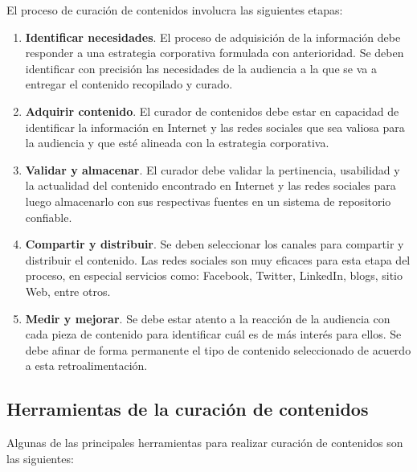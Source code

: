 El proceso de curación de contenidos involucra las siguientes etapas:

\begin{enumerate}
    \item \textbf{Identificar necesidades}. El proceso de adquisición de la información debe responder a una estrategia corporativa formulada con anterioridad. Se deben identificar con precisión las necesidades de la audiencia a la que se va a entregar el contenido recopilado y curado.
    \item \textbf{Adquirir contenido}. El curador de contenidos debe estar en capacidad de identificar la información en Internet y las redes sociales que sea valiosa para la audiencia y que esté alineada con la estrategia corporativa.
    \item \textbf{Validar y almacenar}. El curador debe validar la pertinencia, usabilidad y la actualidad del contenido encontrado en Internet y las redes sociales para luego almacenarlo con sus respectivas fuentes en un sistema de repositorio confiable.
    \item \textbf{Compartir y distribuir}. Se deben seleccionar los canales para compartir y distribuir el contenido. Las redes sociales son muy eficaces para esta etapa del proceso, en especial servicios como: Facebook, Twitter, LinkedIn, blogs, sitio Web, entre otros.
    \item \textbf{Medir y mejorar}. Se debe estar atento a la reacción de la audiencia con cada pieza de contenido para identificar cuál es de más interés para ellos. Se debe afinar de forma permanente el tipo de contenido seleccionado de acuerdo a esta retroalimentación.
\end{enumerate}

\subsection{Herramientas de la curación de contenidos}

Algunas de las principales herramientas para realizar curación de contenidos son las siguientes:


